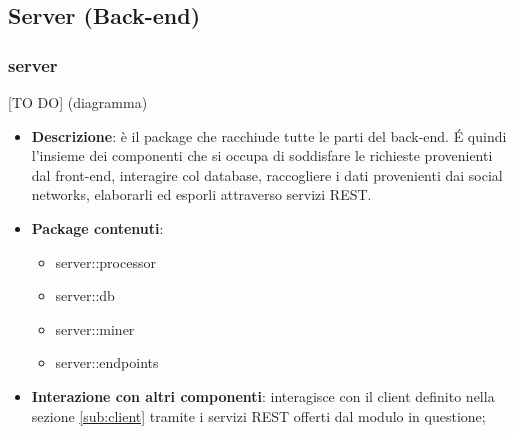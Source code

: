 


\subsection{Server (Back-end)} %
\label{sub:server}

  \subsubsection{server} %
  [TO DO] (diagramma) \newline \newline

  \begin{itemize}
    \item \textbf{Descrizione}: è il package che racchiude tutte le parti del back-end. \'E quindi l'insieme dei componenti che si occupa di soddisfare le richieste provenienti dal front-end, interagire col database, raccogliere i dati provenienti dai social networks, elaborarli ed esporli attraverso servizi REST.
    \item \textbf{Package contenuti}:
      \begin{itemize}
        \item server::processor
        \item server::db
        \item server::miner
        \item server::endpoints
      \end{itemize}
    \item \textbf{Interazione con altri componenti}: interagisce con il client definito nella sezione \ref{sub:client} tramite i servizi REST offerti dal modulo in questione;
  \end{itemize}

